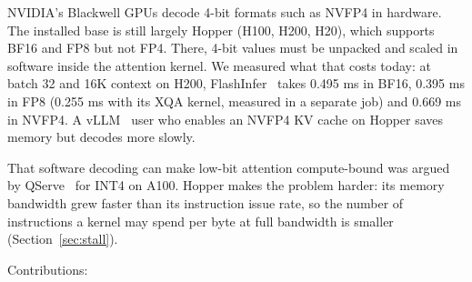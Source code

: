 \documentclass[11pt]{article}
\begin{document}
NVIDIA's Blackwell GPUs decode 4-bit formats such as NVFP4 in hardware. The installed base is still largely Hopper (H100, H200, H20), which supports BF16 and FP8 but not FP4. There, 4-bit values must be unpacked and scaled in software inside the attention kernel. We measured what that costs today: at batch 32 and 16K context on H200, FlashInfer~\cite{ye2025flashinfer} takes 0.495 ms in BF16, 0.395 ms in FP8 (0.255 ms with its XQA kernel, measured in a separate job) and 0.669 ms in NVFP4. A vLLM~\cite{kwon2023vllm} user who enables an NVFP4 KV cache on Hopper saves memory but decodes more slowly.

That software decoding can make low-bit attention compute-bound was argued by QServe~\cite{lin2025qserve} for INT4 on A100. Hopper makes the problem harder: its memory bandwidth grew faster than its instruction issue rate, so the number of instructions a kernel may spend per byte at full bandwidth is smaller (Section~\ref{sec:stall}).

Contributions:
\end{document}

